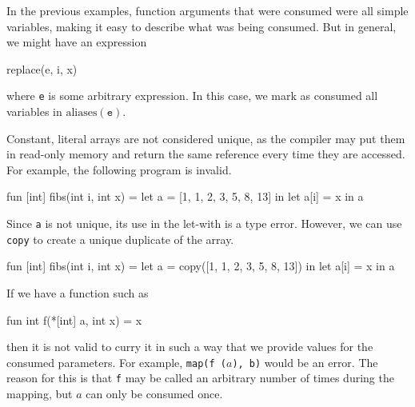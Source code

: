 \documentclass[oneside]{memoir}
\newcommand\aliases[1]{\textrm{aliases}(#1)}
\begin{document}
In the previous examples, function arguments that were consumed were
all simple variables, making it easy to describe what was being
consumed.  But in general, we might have an expression
\begin{colorcode}
  replace(e, i, x)
\end{colorcode}
where \texttt{e} is some arbitrary expression.  In this case, we mark
as consumed all variables in $\aliases{\texttt{e}}$.

Constant, literal arrays are not considered unique, as the compiler
may put them in read-only memory and return the same reference every
time they are accessed.  For example, the following program is
invalid.
\begin{colorcode}
  fun [int] fibs(int i, int x) =
    let a = [1, 1, 2, 3, 5, 8, 13] in
    let a[i] = x in a
\end{colorcode}
Since \texttt{a} is not unique, its use in the let-with is a type
error.  However, we can use \texttt{copy} to create a unique duplicate
of the array.
\begin{colorcode}
  fun [int] fibs(int i, int x) =
    let a = copy([1, 1, 2, 3, 5, 8, 13]) in
    let a[i] = x in a
\end{colorcode}

If we have a function such as
\begin{colorcode}
  fun int f(*[int] a, int x) = x
\end{colorcode}
then it is not valid to curry it in such a way that we provide values
for the consumed parameters.  For example, \texttt{map(f ($a$), b)}
would be an error.  The reason for this is that \texttt{f} may be
called an arbitrary number of times during the mapping, but $a$ can
only be consumed once.
\end{document}
